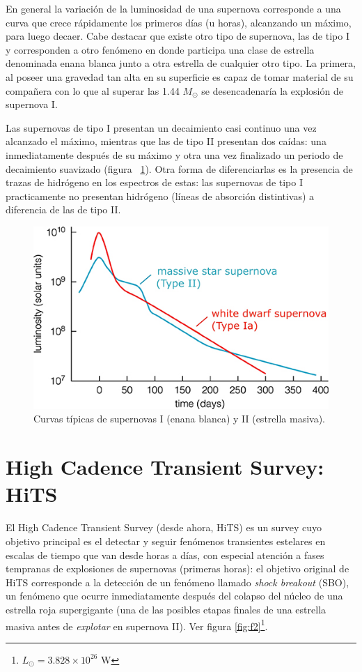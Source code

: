 En general la variaci\'on de la luminosidad de una supernova corresponde a una curva que crece r\'apidamente los primeros d\'ias (u horas), alcanzando un m\'aximo, para luego decaer. Cabe destacar que existe otro tipo de supernova, las de tipo I y corresponden a otro fen\'omeno en donde participa una clase de estrella denominada enana blanca junto a otra estrella de cualquier otro tipo. La primera, al poseer una gravedad tan alta en su superficie es capaz de tomar material de su compa\~nera con lo que al superar las 1.44 $M_{\odot}$ se desencadenar\'ia la explosi\'on de supernova I. 
\bigskip

Las supernovas de tipo I presentan un decaimiento casi continuo una vez alcanzado el m\'aximo, mientras que las de tipo II presentan dos ca\'idas: una inmediatamente despu\'es de su m\'aximo y otra una vez finalizado un periodo de decaimiento suavizado (figura ~\ref{fig:f1}). Otra forma de diferenciarlas es la presencia de trazas de hidr\'ogeno en los espectros de estas: las supernovas de tipo I practicamente no presentan hidr\'ogeno (l\'ineas de absorci\'on distintivas) a diferencia de las de tipo II.\bigskip

\begin{figure}[h!]
\centering
\includegraphics[scale=.8]{images/clear}
\caption{Curvas t\'ipicas de supernovas I (enana blanca) y II (estrella masiva).}
\label{fig:f1}
\end{figure}


\section{High Cadence Transient Survey: HiTS}

El High Cadence Transient Survey\cite{hits} (desde ahora, HiTS) es un survey cuyo objetivo principal es el detectar y seguir fen\'omenos transientes estelares en escalas de tiempo que van desde horas a d\'ias, con especial atenci\'on a fases tempranas de explosiones de supernovas (primeras horas): el objetivo original de HiTS corresponde a la detecci\'on de un fen\'omeno llamado \textit{shock breakout} (SBO), un fen\'omeno que ocurre inmediatamente despu\'es del colapso del n\'ucleo de una estrella roja supergigante (una de las posibles etapas finales de una estrella masiva antes de \textit{explotar} en supernova II). Ver figura \ref{fig:f2}\footnote{$L_{\odot}= 3.828 \times 10^{26}$ W}.

